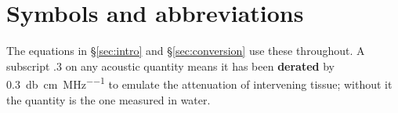 \section*{Symbols and abbreviations}

\noindent
The equations in \S\ref{sec:intro} and \S\ref{sec:conversion} use these throughout. A subscript
$.3$ on any acoustic quantity means it has been \textbf{derated} by
\SI{0.3}{\decibel\per\centi\metre\per\mega\hertz} to emulate the attenuation of intervening tissue;
without it the quantity is the one measured in water.

\newcommand{\nomrow}[2]{#1 & #2 \\}

\begingroup
\small
\setlength{\tabcolsep}{5pt}
\renewcommand{\arraystretch}{1.18}

